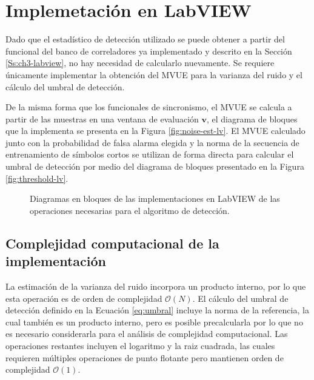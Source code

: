 \color{Green}
\section{Implemetación en LabVIEW}

Dado que el estadístico de detección utilizado se puede obtener a partir del funcional del banco de correladores ya implementado y descrito en la Sección \ref{Ss:ch3-labview}, no hay necesidad de calcularlo nuevamente. Se requiere únicamente implementar la obtención del MVUE para la varianza del ruido y el cálculo del umbral de detección. 

De la misma forma que los funcionales de sincronismo, el MVUE se calcula a partir de las muestras en una ventana de evaluación $\mathbf{v}$, el diagrama de bloques que la implementa se presenta en la Figura \ref{fig:noise-est-lv}. El MVUE calculado junto con la probabilidad de falsa alarma elegida y la norma de la secuencia de entrenamiento de símbolos cortos se utilizan de forma directa para calcular el umbral de detección por medio del diagrama de bloques presentado en la Figura \ref{fig:threshold-lv}.

\begin{figure}[t]
    \centering
    \hfill
    \hfill
    \caption{Diagramas en bloques de las implementaciones en LabVIEW de las operaciones necesarias para el algoritmo de detección.\label{fig:deteccion-lv}}
    \hfill
\end{figure}

\subsection{Complejidad computacional de la implementación}
La estimación de la varianza del ruido incorpora un producto interno, por lo que esta operación es de orden de complejidad $\mathcal{O}(N)$. El cálculo del umbral de detección definido en la Ecuación \ref{eq:umbral} incluye la norma de la referencia, la cual también es un producto interno, pero es posible precalcularla por lo que no es necesario considerarla para el análisis de complejidad computacional. Las operaciones restantes incluyen el logaritmo y la raiz cuadrada, las cuales requieren múltiples operaciones de punto flotante pero mantienen orden de complejidad $\mathcal{O}(1)$.
 

